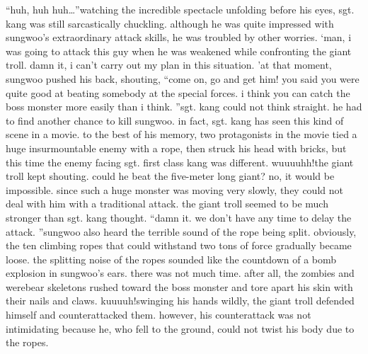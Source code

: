 “huh, huh huh…”watching the incredible spectacle unfolding before his eyes, sgt.
 kang was still sarcastically chuckling.
 although he was quite impressed with sungwoo’s extraordinary attack skills, he was troubled by other worries.
‘man, i was going to attack this guy when he was weakened while confronting the giant troll.
 damn it, i can’t carry out my plan in this situation.
’at that moment, sungwoo pushed his back, shouting, “come on, go and get him! you said you were quite good at beating somebody at the special forces.
 i think you can catch the boss monster more easily than i think.
”sgt.
 kang could not think straight.
 he had to find another chance to kill sungwoo.
in fact, sgt.
 kang has seen this kind of scene in a movie.
to the best of his memory, two protagonists in the movie tied a huge insurmountable enemy with a rope, then struck his head with bricks, but this time the enemy facing sgt.
 first class kang was different.
wuuuuhh!the giant troll kept shouting.
could he beat the five-meter long giant? no, it would be impossible.
since such a huge monster was moving very slowly, they could not deal with him with a traditional attack.
the giant troll seemed to be much stronger than sgt.
 kang thought.
“damn it.
 we don’t have any time to delay the attack.
”sungwoo also heard the terrible sound of the rope being split.
 obviously, the ten climbing ropes that could withstand two tons of force gradually became loose.
the splitting noise of the ropes sounded like the countdown of a bomb explosion in sungwoo’s ears.
there was not much time.
 after all, the zombies and werebear skeletons rushed toward the boss monster and tore apart his skin with their nails and claws.
kuuuuh!swinging his hands wildly, the giant troll defended himself and counterattacked them.
 however, his counterattack was not intimidating because he, who fell to the ground, could not twist his body due to the ropes.


 